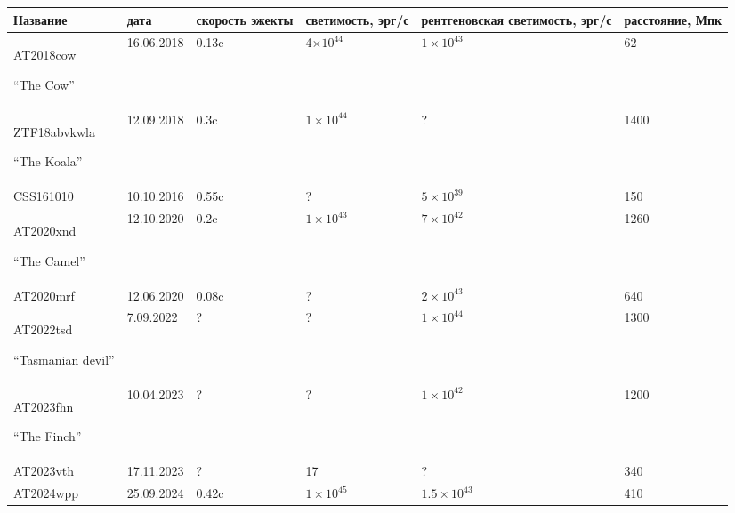 \begin{small}
	\label{FBOTs}
\begin{center}
		\begin{tabular}{|p{} | p{}| p{}| p{}| p{}| p{}|}
            \hline
			Название &дата & скорость эжекты & светимость, эрг/с&  рентгеновская светимость, эрг/с& расстояние, Мпк\\
			\hline
			AT2018cow
            
            “The Cow”\cite{Ho2019cow}& 16.06.2018 & 0.13c & 4$\times 10^44$  & $1\times 10^{43}$ & 62\\
			\hline
			ZTF18abvkwla
            
            “The Koala\cite{Ho2020}”& 12.09.2018 & 0.3c& $1\times 10^44$&  ? & 1400\\
			\hline
			CSS161010\cite{Coppejans2020} & 10.10.2016 & 0.55c& ?&  $5\times 10^{39}$& 150\\
			\hline
			AT2020xnd 
            
            “The Camel”\cite{PerleyCamel}& 12.10.2020 & 0.2c& $1\times10^43$&  $7\times 10^{42}$& 1260\\
			\hline
			AT2020mrf\cite{YaoAt2020mrf}& 12.06.2020 & 0.08c& ?&  $2\times 10^{43}$& 640\\
			\hline
			AT2022tsd
            
			“Tasmanian devil”\cite{MatthewsAT2022tsd}& 7.09.2022 & ?& ?&  $1\times 10^{44}$& 1300\\
			\hline
			AT2023fhn
            
			“The Finch”\cite{ChrimesAT2023fhn}& 10.04.2023 & ?& ?&  $1\times 10^{42}$& 1200\\
			\hline
			AT2023vth\cite{Perleyvth}& 17.11.2023 & ?& 17&  ?& 340\\
			\hline
			AT2024wpp\cite{NayanaAT2024wpp}& 25.09.2024& 0.42c & $1\times10^45$& $1.5\times10^43$& 410\\
			\hline
        \end{tabular}
        \end{center}
\end{small}

